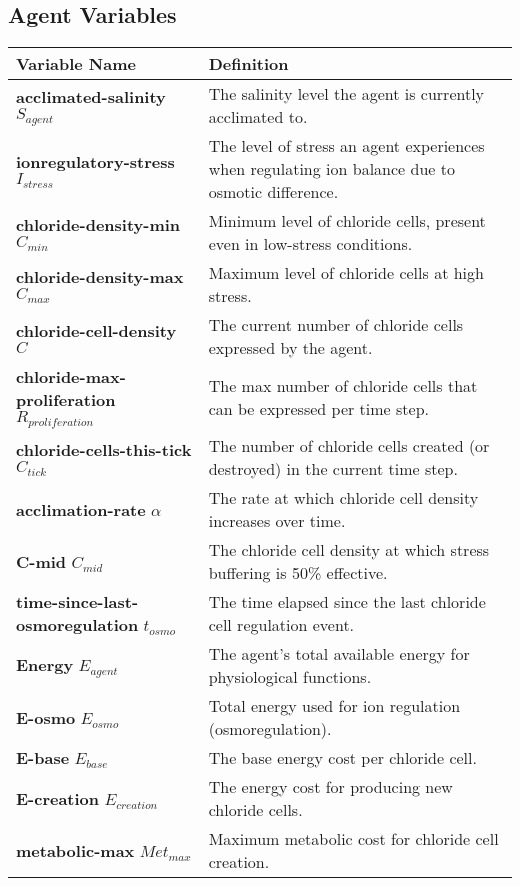 \documentclass[
]{book}
\begin{document}
\subsection{Agent Variables}\label{agent-variables}

\begin{longtable}[]{@{}
  >{\raggedright\arraybackslash}p{}
  >{\raggedright\arraybackslash}p{}@{}}
\toprule\noalign{}
\begin{minipage}[b]{\linewidth}\raggedright
Variable Name
\end{minipage} & \begin{minipage}[b]{\linewidth}\raggedright
Definition
\end{minipage} \\
\midrule\noalign{}
\endhead
\bottomrule\noalign{}
\endlastfoot
\textbf{acclimated-salinity} \(S_{agent}\) & The salinity level the agent is currently acclimated to. \\
\textbf{ionregulatory-stress} \(I_{stress}\) & The level of stress an agent experiences when regulating ion balance due to osmotic difference. \\
\textbf{chloride-density-min} \(C_{min}\) & Minimum level of chloride cells, present even in low-stress conditions. \\
\textbf{chloride-density-max} \(C_{max}\) & Maximum level of chloride cells at high stress. \\
\textbf{chloride-cell-density} \(C\) & The current number of chloride cells expressed by the agent. \\
\textbf{chloride-max-proliferation} \(R_{proliferation}\) & The max number of chloride cells that can be expressed per time step. \\
\textbf{chloride-cells-this-tick} \(C_{tick}\) & The number of chloride cells created (or destroyed) in the current time step. \\
\textbf{acclimation-rate} \(\alpha\) & The rate at which chloride cell density increases over time. \\
\textbf{C-mid} \(C_{mid}\) & The chloride cell density at which stress buffering is 50\% effective. \\
\textbf{time-since-last-osmoregulation} \(t_{osmo}\) & The time elapsed since the last chloride cell regulation event. \\
\textbf{Energy} \(E_{agent}\) & The agent's total available energy for physiological functions. \\
\textbf{E-osmo} \(E_{osmo}\) & Total energy used for ion regulation (osmoregulation). \\
\textbf{E-base} \(E_{base}\) & The base energy cost per chloride cell. \\
\textbf{E-creation} \(E_{creation}\) & The energy cost for producing new chloride cells. \\
\textbf{metabolic-max} \(Met_{max}\) & Maximum metabolic cost for chloride cell creation. \\
\end{longtable}
\end{document}
